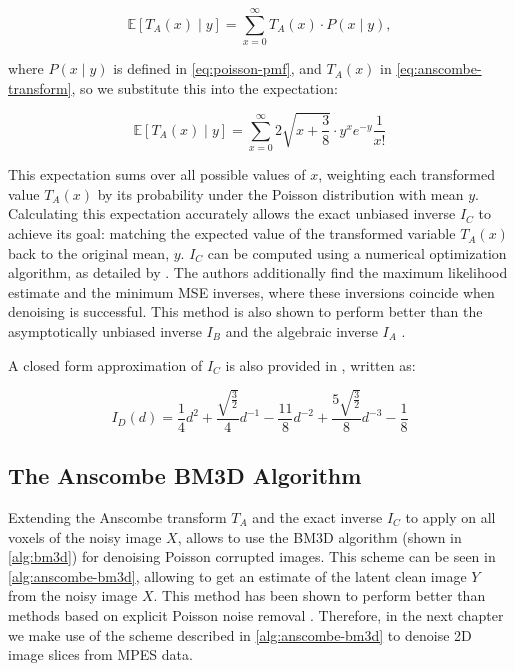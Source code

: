 \begin{equation}   
    \mathbb{E}[T_A(x) \mid y] = \sum_{x=0}^{\infty} T_A(x) \cdot P(x \mid y),
\end{equation}

where $P(x \mid y)$ is defined in \cref{eq:poisson-pmf}, and $T_A(x)$ in \cref{eq:anscombe-transform}, so we substitute this into the expectation:

\begin{equation}
    \mathbb{E}[T_A(x) \mid y] = \sum_{x=0}^{\infty} 2 \sqrt{x + \frac{3}{8}} \cdot y^x e^{-y} \frac{1}{x!}
\end{equation}

This expectation sums over all possible values of $x$, weighting each transformed value $T_A(x)$ by its probability under the Poisson distribution with mean $y$. Calculating this expectation accurately allows the exact unbiased inverse  $I_C$  to achieve its goal: matching the expected value of the transformed variable $T_A(x)$ back to the original mean, $y$. $I_C$ can be computed using a numerical optimization algorithm, as detailed by \cite{makitaloOptimalInversionAnscombe2011}. The authors additionally find the maximum likelihood estimate and the minimum \gls{MSE} inverses, where these inversions coincide when denoising is successful. This method is also shown to perform better than the asymptotically unbiased inverse $I_B$ and the algebraic inverse $I_A$ \cite{makitaloOptimalInversionAnscombe2011}.

A closed form approximation of $I_C$ is also provided in \cite{makitaloClosedFormApproximationExact2011}, written as:

\begin{equation}
    I_D(d) = \frac{1}{4} d^2 + \frac{\sqrt{\frac{3}{2}}}{4} d^{-1} - \frac{11}{8} d^{-2} + \frac{5 \sqrt{\frac{3}{2}}}{8} d^{-3} - \frac{1}{8}
\end{equation}

\subsection{The Anscombe BM3D Algorithm}
Extending the Anscombe transform $T_A$ and the exact inverse $I_C$ to apply on all voxels of the noisy image $X$, allows to use the \gls{BM3D} algorithm (shown in \cref{alg:bm3d}) for denoising Poisson corrupted images. This scheme can be seen in \cref{alg:anscombe-bm3d}, allowing to get an estimate of the latent clean image $Y$ from the noisy image $X$. This method has been shown to perform better than methods based on explicit Poisson noise removal \cite{makitaloOptimalInversionAnscombe2011}. Therefore, in the next chapter we make use of the scheme described in \cref{alg:anscombe-bm3d} to denoise 2D image slices from \gls{MPES} data.

